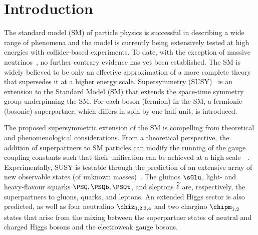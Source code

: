 \section{Introduction}
\label{sec:introduction}

The standard model (SM) of particle physics is successful in
describing a wide range of phenomena and the model is currently being
extensively tested at high energies with collider-based experiments.
To date, with the exception of massive neutrinos~\cite{Fukuda:1998mi,
  Ahmad:2001an, Ahmad:2002jz}, no further contrary evidence has yet
been established. The SM is widely believed to be only an effective
approximation of a more complete theory that supersedes it at a higher
energy scale. Supersymmetry (SUSY)~\cite{ref:SUSY-1, ref:SUSY0,
  ref:SUSY3, ref:SUSY1} is an extension to the Standard Model (SM)
that extends the space-time symmetry group underpinning the SM. For
each boson (fermion) in the SM, a fermionic (bosonic) superpartner,
which differs in spin by one-half unit, is introduced.

The proposed supersymmetric extension of the SM is compelling from
theoretical and phenomenological considerations. From a theoretical
perspective, the addition of superpartners to SM particles can modify
the running of the gauge coupling constants such that their
unification can be achieved at a high scale~~\cite{Dimopoulos:1981yj,
  Ibanez:1981yh, Marciano:1981un}.  Experimentally, SUSY is testable
through the prediction of an extensive array of new observable states
(of unknown masses)~\cite{ref:SUSY4, ref:SUSY2}. The gluinos $\sGlu$,
light- and heavy-flavour squarks $\PSQ, \PSQb, \PSQt$, and sleptons
$\widetilde{\ell}$ are, respectively, the superpartners to gluons, quarks, and
leptons. An extended Higgs sector is also predicted, as well as four
neutralino $\chiz_{1,2,3,4}$ and two chargino $\chipm_{1,2}$ states
that arise from the mixing between the superpartner states of neutral
and charged Higgs bosons and the electroweak gauge bosons.

